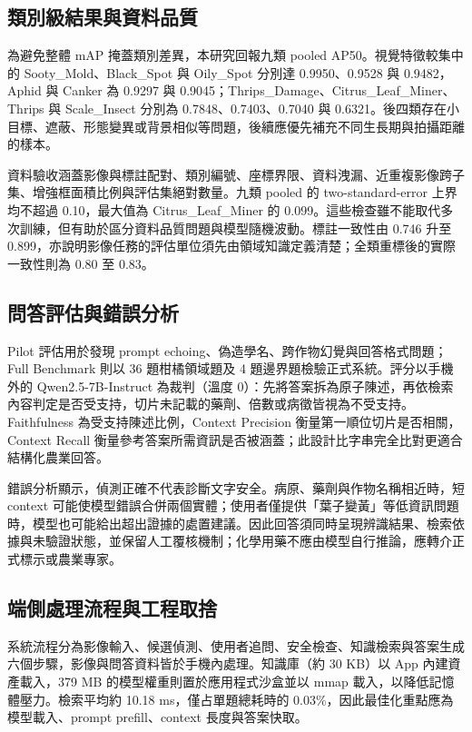 \documentclass[10pt,twocolumn,a4paper]{article}
\begin{document}
\subsection{類別級結果與資料品質}
為避免整體 mAP 掩蓋類別差異，本研究回報九類 pooled AP50。視覺特徵較集中的 Sooty\_Mold、Black\_Spot 與 Oily\_Spot 分別達 0.9950、0.9528 與 0.9482，Aphid 與 Canker 為 0.9297 與 0.9045；Thrips\_Damage、Citrus\_Leaf\_Miner、Thrips 與 Scale\_Insect 分別為 0.7848、0.7403、0.7040 與 0.6321。後四類存在小目標、遮蔽、形態變異或背景相似等問題，後續應優先補充不同生長期與拍攝距離的樣本。

資料驗收涵蓋影像與標註配對、類別編號、座標界限、資料洩漏、近重複影像跨子集、增強框面積比例與評估集絕對數量。九類 pooled 的 two-standard-error 上界均不超過 0.10，最大值為 Citrus\_Leaf\_Miner 的 0.099。這些檢查雖不能取代多次訓練，但有助於區分資料品質問題與模型隨機波動。標註一致性由 0.746 升至 0.899，亦說明影像任務的評估單位須先由領域知識定義清楚；全類重標後的實際一致性則為 0.80 至 0.83。

\subsection{問答評估與錯誤分析}
Pilot 評估用於發現 prompt echoing、偽造學名、跨作物幻覺與回答格式問題；Full Benchmark 則以 36 題柑橘領域題及 4 題邊界題檢驗正式系統。評分以手機外的 Qwen2.5-7B-Instruct 為裁判（溫度 0）：先將答案拆為原子陳述，再依檢索內容判定是否受支持，切片未記載的藥劑、倍數或病徵皆視為不受支持\cite{es2023}。Faithfulness 為受支持陳述比例，Context Precision 衡量第一順位切片是否相關，Context Recall 衡量參考答案所需資訊是否被涵蓋；此設計比字串完全比對更適合結構化農業回答。

錯誤分析顯示，偵測正確不代表診斷文字安全。病原、藥劑與作物名稱相近時，短 context 可能使模型錯誤合併兩個實體；使用者僅提供「葉子變黃」等低資訊問題時，模型也可能給出超出證據的處置建議。因此回答須同時呈現辨識結果、檢索依據與未驗證狀態，並保留人工覆核機制；化學用藥不應由模型自行推論，應轉介正式標示或農業專家。

\subsection{端側處理流程與工程取捨}
系統流程分為影像輸入、候選偵測、使用者追問、安全檢查、知識檢索與答案生成六個步驟，影像與問答資料皆於手機內處理。知識庫（約 30 KB）以 App 內建資產載入，379 MB 的模型權重則置於應用程式沙盒並以 mmap 載入，以降低記憶體壓力。檢索平均約 10.18 ms，僅占單題總耗時的 0.03\%，因此最佳化重點應為模型載入、prompt prefill、context 長度與答案快取。
\end{document}
